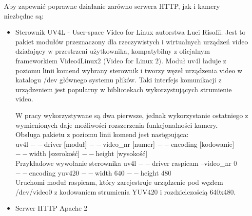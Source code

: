 \begin{description}
\item Aby zapewnić poprawne działanie zarówno serwera HTTP, jak i kamery niezbędne są:
	\begin{itemize}[noitemsep]
	\item Sterownik UV4L - User-space Video for Linux autorstwa Luci Risolii. Jest to pakiet modułów przeznaczony dla rzeczywistych i wirtualnych urządzeń video  działający w przestrzeni użytkownika, kompatybilny z oficjalnym frameworkiem Video4Linux2 (Video for Linux 2). Moduł uv4l ładuje z poziomu linii komend wybrany sterownik i tworzy węzeł urządzenia video w katalogu /dev głównego systemu plików. Taki interfejs komunikacji z urządzeniem jest popularny w bibliotekach wykorzystujących strumienie video.\\
W pracy wykorzystywane są dwa pierwsze, jednak wykorzystanie ostatniego z wymienionych daje możliwości rozszerzenia funkcjonalności kamery.\\
Obsługa pakietu z poziomu linii komend jest następująca:\\
uv4l $--$driver [moduł] $--$video\_nr [numer] $--$encoding [kodowanie] $--$width [szerokość] $--$height [wysokość] \\
Przykładowe wywołanie sterownika uv4l $--$driver raspicam --video\_nr 0 $--$encoding yuv420 $--$width 640 $--$height 480\\
Uruchomi moduł raspicam, który zarejestruje urządzenie pod węzłem /dev/video0 z kodowaniem strumienia YUV420 i rozdzielczością 640x480.\\
	\item Serwer HTTP Apache 2
		\end{itemize}
\end{description}


